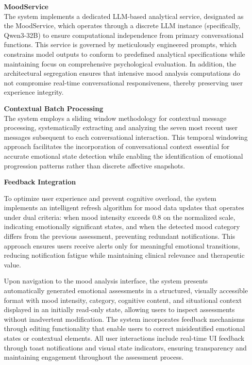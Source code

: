 \textbf{MoodService }\\
The system implements a dedicated LLM-based analytical service, designated as the MoodService, which operates through a discrete LLM instance (specifically, Qwen3-32B) to ensure computational independence from primary conversational functions. This service is governed by meticulously engineered prompts, which constrains model outputs to conform to predefined analytical specifications while maintaining focus on comprehensive psychological evaluation. In addition, the architectural segregation  ensures that intensive mood analysis computations do not compromise real-time conversational responsiveness, thereby preserving user experience integrity.

\textbf{Contextual Batch Processing}\\
The system employs a sliding window methodology for contextual message processing, systematically extracting and analyzing the seven most recent user messages subsequent to each conversational interaction. This temporal windowing approach facilitates the incorporation of conversational context essential for accurate emotional state detection while enabling the identification of emotional progression patterns rather than discrete affective snapshots. 

\textbf{Feedback Integration}

To optimize user experience and prevent cognitive overload, the system implements an intelligent refresh algorithm for mood data updates that operates under dual criteria: when mood intensity exceeds 0.8 on the normalized scale, indicating emotionally significant states, and when the detected mood category differs from the previous assessment, preventing redundant notifications. This approach ensures users receive alerts only for meaningful emotional transitions, reducing notification fatigue while maintaining clinical relevance and therapeutic value.

Upon navigation to the mood analysis interface, the system presents automatically generated emotional assessments in a structured, visually accessible format with mood intensity, category, cognitive content, and situational context displayed in an initially read-only state, allowing users to inspect assessments without inadvertent modification. The system incorporates feedback mechanisms through editing functionality that enable users to correct misidentified emotional states or contextual elements. All user interactions include real-time UI feedback through toast notifications and visual state indicators, ensuring transparency and maintaining engagement throughout the assessment process.

